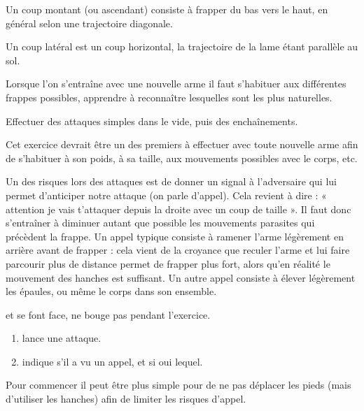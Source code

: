 \begin{coup}
	\label{att:coup:montant}

	Un coup montant (ou ascendant) consiste à frapper du bas vers le haut, en général selon une trajectoire diagonale.
\end{coup}


\begin{coup}
	\label{att:coup:latéral}

	Un coup latéral est un coup horizontal, la trajectoire de la lame étant parallèle au sol.
\end{coup}


Lorsque l'on s'entraîne avec une nouvelle arme il faut s'habituer aux différentes frappes possibles, apprendre à reconnaître lesquelles sont les plus naturelles.


\begin{exercice}


	Effectuer des attaques simples dans le vide, puis des enchaînements.

	Cet exercice devrait être un des premiers à effectuer avec toute nouvelle arme afin de s'habituer à son poids, à sa taille, aux mouvements possibles avec le corps, etc.
\end{exercice}


Un des risques lors des attaques est de donner un signal à l'adversaire qui lui permet d'anticiper notre attaque (on parle d'appel).
Cela revient à dire : « attention je vais t'attaquer depuis la droite avec un coup de taille ».
Il faut donc s'entraîner à diminuer autant que possible les mouvements parasites qui précèdent la frappe.
Un appel typique consiste à ramener l'arme légèrement en arrière avant de frapper : cela vient de la croyance que reculer l'arme et lui faire parcourir plus de distance permet de frapper plus fort, alors qu'en réalité le mouvement des hanches est suffisant.
Un autre appel consiste à élever légèrement les épaules, ou même le corps dans son ensemble.


\begin{exercice}


	\A et \D se font face, \D ne bouge pas pendant l'exercice.

	\begin{enumerate}
		\item \A lance une attaque.
		
		\item \D indique s'il a vu un appel, et si oui lequel.
	\end{enumerate}

	Pour commencer il peut être plus simple pour \A de ne pas déplacer les pieds (mais d'utiliser les hanches) afin de limiter les risques d'appel.
\end{exercice}

